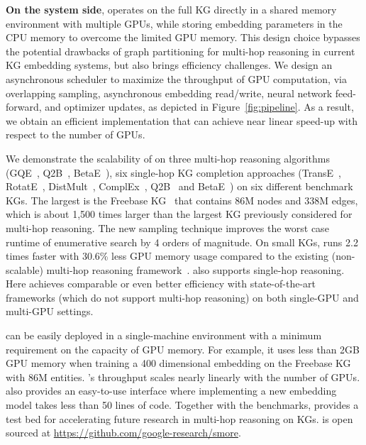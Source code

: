 \textbf{On the system side}, \modelshort operates on the full KG directly in a shared memory environment with multiple GPUs, while storing embedding parameters in the CPU memory to overcome the limited GPU memory. This design choice bypasses the potential drawbacks of graph partitioning for multi-hop reasoning in current KG embedding systems, but also brings efficiency challenges. We design an asynchronous scheduler to maximize the throughput of GPU computation, via overlapping sampling, asynchronous embedding read/write, neural network feed-forward, and optimizer updates, as depicted in Figure~\ref{fig:pipeline}. 
As a result, we obtain an efficient implementation that can achieve near linear speed-up with respect to the number of GPUs.

We demonstrate the scalability of \modelshort on three multi-hop reasoning algorithms (GQE~\citep{hamilton2018embedding}, Q2B~\citep{ren2020query2box}, BetaE~\citep{ren2020beta}), six single-hop KG completion approaches (TransE~\citep{bordes2013translating}, RotatE~\cite{sun2019rotate}, DistMult~\cite{yang2014embedding}, ComplEx~\cite{trouillon2016complex}, Q2B~\citep{ren2020query2box} and BetaE~\citep{ren2020beta}) on six different benchmark KGs. The largest is the Freebase KG~\cite{bollacker2008freebase,zheng2020dgl} that contains 86M nodes and 338M edges, which is about 1,500 times larger than the largest KG previously considered for multi-hop reasoning. The new sampling technique improves the worst case runtime of enumerative search by 4 orders of magnitude. On small KGs, \modelshort{} runs 2.2 times faster with 30.6\% less GPU memory usage compared to the existing (non-scalable) multi-hop reasoning framework~\citep{kgreasoning}. 
\modelshort also supports single-hop reasoning. Here \modelshort achieves comparable or even better efficiency with state-of-the-art frameworks (which do not support multi-hop reasoning) on both single-GPU and multi-GPU settings.

\modelshort can be easily deployed in a single-machine environment with a minimum requirement on the capacity of GPU memory. For example, it uses less than 2GB GPU memory when training a 400 dimensional embedding on the Freebase KG with 86M entities. \modelshort's throughput scales nearly linearly with the number of GPUs. 
%  
\modelshort also provides an easy-to-use interface where implementing a new embedding model takes less than 50 lines of code. Together with the benchmarks, \modelshort provides a test bed for accelerating future research in multi-hop reasoning on KGs. \modelshort is open sourced at \url{https://github.com/google-research/smore}.

